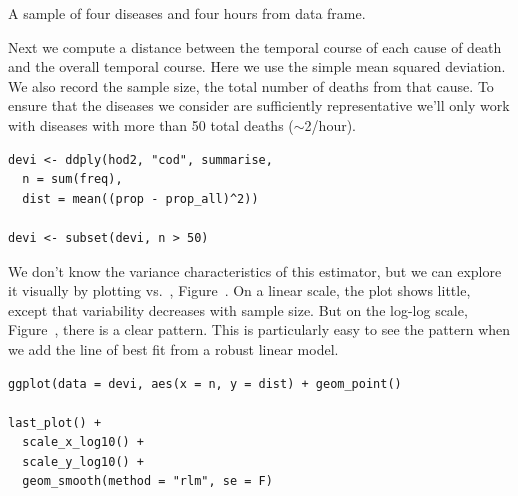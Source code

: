 \documentclass[article]{jss}
\begin{document}
\begin{table}[htbp]
  \centering
  \subfloat[]{
    \label{tbl:counts:1}
  }%
  \subfloat[]{
    \label{tbl:counts:2}
  }%
  \subfloat[]{
    \label{tbl:counts:3}
  }%
  \subfloat[]{
    \label{tbl:counts:4}
  }
  
  \caption{A sample of four diseases and four hours from  data frame.}
  \label{tbl:counts}
\end{table}

Next we compute a distance between the temporal course of each cause of death and the overall temporal course. Here we use the simple mean squared deviation.  We also record the sample size, the total number of deaths from that cause. To ensure that the diseases we consider are sufficiently representative we'll only work with diseases with more than 50 total deaths ($\sim$2/hour).

\begin{Verbatim}
devi <- ddply(hod2, "cod", summarise, 
  n = sum(freq), 
  dist = mean((prop - prop_all)^2))

devi <- subset(devi, n > 50)
\end{Verbatim}

We don't know the variance characteristics of this estimator, but we can explore it visually by plotting  vs.\ , Figure~. On a linear scale, the plot shows little, except that variability decreases with sample size. But on the log-log scale, Figure~, there is a clear pattern. This is particularly easy to see the pattern when we add the line of best fit from a robust linear model. 

\begin{Verbatim}
ggplot(data = devi, aes(x = n, y = dist) + geom_point()

last_plot() + 
  scale_x_log10() + 
  scale_y_log10() +
  geom_smooth(method = "rlm", se = F)
\end{Verbatim}
\end{document}
